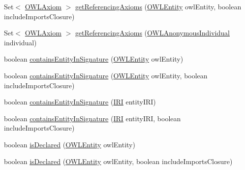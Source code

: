 \begin{DoxyCompactItemize}
\item 
Set$<$ \hyperlink{interfaceorg_1_1semanticweb_1_1owlapi_1_1model_1_1_o_w_l_axiom}{O\-W\-L\-Axiom} $>$ \hyperlink{interfaceorg_1_1semanticweb_1_1owlapi_1_1model_1_1_o_w_l_ontology_a7ce1801b61de3cfe24170a9f3810d58e}{get\-Referencing\-Axioms} (\hyperlink{interfaceorg_1_1semanticweb_1_1owlapi_1_1model_1_1_o_w_l_entity}{O\-W\-L\-Entity} owl\-Entity, boolean include\-Imports\-Closure)
\item 
Set$<$ \hyperlink{interfaceorg_1_1semanticweb_1_1owlapi_1_1model_1_1_o_w_l_axiom}{O\-W\-L\-Axiom} $>$ \hyperlink{interfaceorg_1_1semanticweb_1_1owlapi_1_1model_1_1_o_w_l_ontology_ad3de028c8c330579d0d26d54d87fb768}{get\-Referencing\-Axioms} (\hyperlink{interfaceorg_1_1semanticweb_1_1owlapi_1_1model_1_1_o_w_l_anonymous_individual}{O\-W\-L\-Anonymous\-Individual} individual)
\item 
boolean \hyperlink{interfaceorg_1_1semanticweb_1_1owlapi_1_1model_1_1_o_w_l_ontology_a5313978c0818a26a0de52d6a57889df3}{contains\-Entity\-In\-Signature} (\hyperlink{interfaceorg_1_1semanticweb_1_1owlapi_1_1model_1_1_o_w_l_entity}{O\-W\-L\-Entity} owl\-Entity)
\item 
boolean \hyperlink{interfaceorg_1_1semanticweb_1_1owlapi_1_1model_1_1_o_w_l_ontology_a82b2ece8d940832f646183bb01a23ff2}{contains\-Entity\-In\-Signature} (\hyperlink{interfaceorg_1_1semanticweb_1_1owlapi_1_1model_1_1_o_w_l_entity}{O\-W\-L\-Entity} owl\-Entity, boolean include\-Imports\-Closure)
\item 
boolean \hyperlink{interfaceorg_1_1semanticweb_1_1owlapi_1_1model_1_1_o_w_l_ontology_adfb7b633a327651374f4b2c64f71689c}{contains\-Entity\-In\-Signature} (\hyperlink{classorg_1_1semanticweb_1_1owlapi_1_1model_1_1_i_r_i}{I\-R\-I} entity\-I\-R\-I)
\item 
boolean \hyperlink{interfaceorg_1_1semanticweb_1_1owlapi_1_1model_1_1_o_w_l_ontology_a3e4e5eef78bfae799bb2711994451dcc}{contains\-Entity\-In\-Signature} (\hyperlink{classorg_1_1semanticweb_1_1owlapi_1_1model_1_1_i_r_i}{I\-R\-I} entity\-I\-R\-I, boolean include\-Imports\-Closure)
\item 
boolean \hyperlink{interfaceorg_1_1semanticweb_1_1owlapi_1_1model_1_1_o_w_l_ontology_a0515d5fb77d4724ca485254c5c109bf0}{is\-Declared} (\hyperlink{interfaceorg_1_1semanticweb_1_1owlapi_1_1model_1_1_o_w_l_entity}{O\-W\-L\-Entity} owl\-Entity)
\item 
boolean \hyperlink{interfaceorg_1_1semanticweb_1_1owlapi_1_1model_1_1_o_w_l_ontology_a732aaf44313e3e87dd9dc037c79d9ffb}{is\-Declared} (\hyperlink{interfaceorg_1_1semanticweb_1_1owlapi_1_1model_1_1_o_w_l_entity}{O\-W\-L\-Entity} owl\-Entity, boolean include\-Imports\-Closure)

\end{DoxyCompactItemize}

